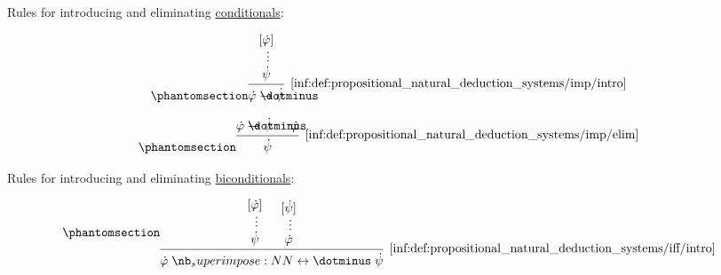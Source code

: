\begin{definition}
\begin{thmenum}
     Rules for introducing and eliminating \hyperref[def:propositional_alphabet/connectives/conditional]{conditionals}:
    \begin{paracol}{2}
      \begin{leftcolumn}
        \ParacolAlignmentHack
        \begin{equation*}\taglabel[\ensuremath{ \rightarrow_+ }]{inf:def:propositional_natural_deduction_systems/imp/intro}
          \begin{prooftree}[center=false]
            \hypo{ [\syn\varphi] }
            \ellipsis {} { \syn\psi }
            \infer1[\ref{inf:def:propositional_natural_deduction_systems/imp/intro}]{ \syn\varphi \synimplies \syn\psi }
          \end{prooftree}
        \end{equation*}
      \end{leftcolumn}

      \begin{rightcolumn}
        \ParacolAlignmentHack
        \begin{equation*}\taglabel[\ensuremath{ \rightarrow_- }]{inf:def:propositional_natural_deduction_systems/imp/elim}
          \begin{prooftree}[center=false]
            \hypo{ \syn\varphi \synimplies \syn\psi }
            \hypo{ \syn\varphi }
            \infer2[\ref{inf:def:propositional_natural_deduction_systems/imp/elim}]{ \syn\psi }
          \end{prooftree}
        \end{equation*}
      \end{rightcolumn}
    \end{paracol}

    \mimprovised Rules for introducing and eliminating \hyperref[def:propositional_alphabet/connectives/biconditional]{biconditionals}:
    \begin{paracol}{3}
      \begin{leftcolumn}
        \ParacolAlignmentHack
        \begin{equation*}\taglabel[\ensuremath{ \leftrightarrow_+ }]{inf:def:propositional_natural_deduction_systems/iff/intro}
          \begin{prooftree}
            \hypo{ [\syn\varphi] }
            \ellipsis {} { \syn\psi }
            \hypo{ [\syn\psi] }
            \ellipsis {} { \syn\varphi }
            \infer2[\ref{inf:def:propositional_natural_deduction_systems/iff/intro}]{ \syn\varphi \syniff \syn\psi }
          \end{prooftree}
        \end{equation*}
      \end{leftcolumn}


\end{paracol}
\end{thmenum}
\end{definition}
